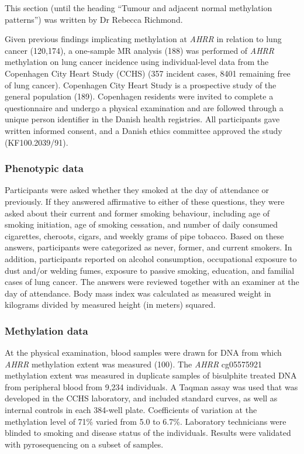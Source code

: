 \documentclass[11pt,oneside]{bristolthesis}
\begin{document}
This section (until the heading ``Tumour and adjacent normal methylation patterns'') was written by Dr Rebecca Richmond.

Given previous findings implicating methylation at \emph{AHRR} in relation to lung cancer (120,174), a one-sample MR analysis (188) was performed of \emph{AHRR} methylation on lung cancer incidence using individual-level data from the Copenhagen City Heart Study (CCHS) (357 incident cases, 8401 remaining free of lung cancer). Copenhagen City Heart Study is a prospective study of the general population (189). Copenhagen residents were invited to complete a questionnaire and undergo a physical examination and are followed through a unique person identifier in the Danish health registries. All participants gave written informed consent, and a Danish ethics committee approved the study (KF100.2039/91).

\hypertarget{phenotypic-data}{%
\subsubsection{Phenotypic data}\label{phenotypic-data}}

Participants were asked whether they smoked at the day of attendance or previously. If they answered affirmative to either of these questions, they were asked about their current and former smoking behaviour, including age of smoking initiation, age of smoking cessation, and number of daily consumed cigarettes, cheroots, cigars, and weekly grams of pipe tobacco. Based on these answers, participants were categorized as never, former, and current smokers. In addition, participants reported on alcohol consumption, occupational exposure to dust and/or welding fumes, exposure to passive smoking, education, and familial cases of lung cancer. The answers were reviewed together with an examiner at the day of attendance. Body mass index was calculated as measured weight in kilograms divided by measured height (in meters) squared.

\hypertarget{methylation-data}{%
\subsubsection{Methylation data}\label{methylation-data}}

At the physical examination, blood samples were drawn for DNA from which \emph{AHRR} methylation extent was measured (100). The \emph{AHRR} cg05575921 methylation extent was measured in duplicate samples of bisulphite treated DNA from peripheral blood from 9,234 individuals. A Taqman assay was used that was developed in the CCHS laboratory, and included standard curves, as well as internal controls in each 384-well plate. Coefficients of variation at the methylation level of 71\% varied from 5.0 to 6.7\%. Laboratory technicians were blinded to smoking and disease status of the individuals. Results were validated with pyrosequencing on a subset of samples.
\end{document}
